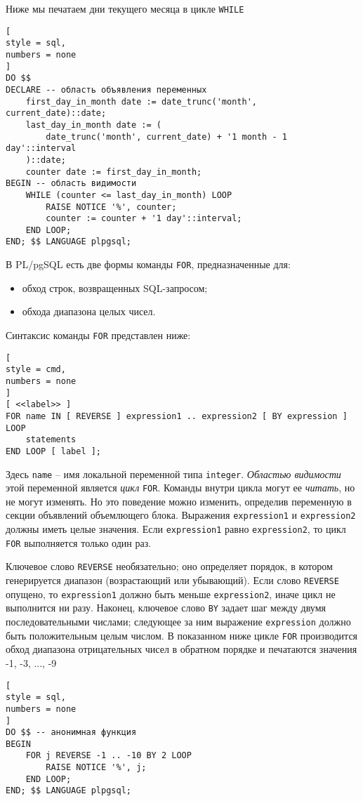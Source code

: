 \documentclass[%
	11pt,
	a4paper,
	utf8,
		]{article}
\begin{document}
Ниже мы печатаем дни текущего месяца в цикле \texttt{WHILE}
\begin{lstlisting}[
style = sql,
numbers = none
]
DO $$
DECLARE -- область объявления переменных
    first_day_in_month date	:= date_trunc('month', current_date)::date;
    last_day_in_month date := (
        date_trunc('month', current_date) + '1 month - 1 day'::interval
    )::date;
    counter date := first_day_in_month;
BEGIN -- область видимости
    WHILE (counter <= last_day_in_month) LOOP
        RAISE NOTICE '%', counter;
        counter := counter + '1 day'::interval;
    END LOOP;
END; $$ LANGUAGE plpgsql;
\end{lstlisting}

В PL/pgSQL есть две формы команды \texttt{FOR}, предназначенные для:
\begin{itemize}
	\item обход строк, возвращенных SQL-запросом;
	
	\item обхода диапазона целых чисел.
\end{itemize}

Синтаксис команды \texttt{FOR} представлен ниже:
\begin{lstlisting}[
style = cmd,
numbers = none
]
[ <<label>> ]
FOR name IN [ REVERSE ] expression1 .. expression2 [ BY expression ] LOOP
    statements
END LOOP [ label ];
\end{lstlisting}

Здесь \texttt{name} -- имя локальной переменной типа \texttt{integer}. \emph{Областью видимости} этой переменной является \emph{цикл} \texttt{FOR}. Команды внутри цикла могут ее \emph{читать}, но не могут изменять. Но это поведение можно изменить, определив переменную в секции объявлений объемлющего блока. Выражения \texttt{expression1} и \texttt{expression2} должны иметь целые значения. Если \texttt{expression1} равно \texttt{expression2}, то цикл \texttt{FOR} выполняется только один раз.

Ключевое слово \texttt{REVERSE} необязательно; оно определяет порядок, в котором генерируется диапазон (возрастающий или убывающий). Если слово \texttt{REVERSE} опущено, то \texttt{expression1} должно быть меньше \texttt{expression2}, иначе цикл не выполнится ни разу. Наконец, ключевое слово \texttt{BY} задает шаг между двумя последовательными числами; следующее за ним выражение \texttt{expression} должно быть положительным целым числом. В показанном ниже цикле \texttt{FOR} производится обход диапазона отрицательных чисел в обратном порядке и печатаются значения -1, -3, ..., -9
\begin{lstlisting}[
style = sql,
numbers = none
]
DO $$ -- анонимная функция
BEGIN
    FOR j REVERSE -1 .. -10 BY 2 LOOP
        RAISE NOTICE '%', j;
    END LOOP;
END; $$ LANGUAGE plpgsql;
\end{lstlisting}
\end{document}
